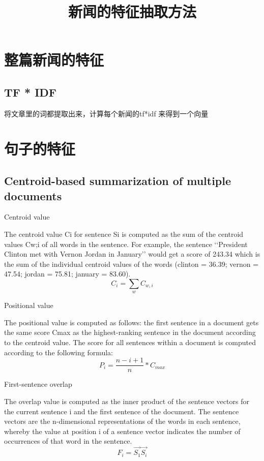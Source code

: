 \documentclass{article}
\begin{document}
\begin{CJK}{UTF8}{gkai}


\title{新闻的特征抽取方法}
\maketitle

\section{整篇新闻的特征}

\subsection{TF * IDF}

将文章里的词都提取出来，计算每个新闻的tf*idf 来得到一个向量


\section{句子的特征}
\subsection{Centroid-based summarization of multiple documents}
\cite{2004-Radev-p919-938}

Centroid value

The centroid value Ci for sentence Si is computed as the sum of the centroid values Cw;i of all words in the sentence. For example, the sentence ‘‘President Clinton met with Vernon Jordan in January’’ would get a score of 243.34 which is the sum of the individual centroid values of the words (clinton = 36.39; vernon = 47.54; jordan = 75.81; january = 83.60).
\begin{equation}
C_i = \sum_wC_{w,i}
\end{equation}

Positional value

The positional value is computed as follows: the first sentence in a document gets the same score Cmax as the highest-ranking sentence in the document according to the centroid value. The score for all sentences within a document is computed according to the following formula:
\begin{equation}
P_i = \frac{n-i+1}{n}*C_{max}
\end{equation}

First-sentence overlap

The overlap value is computed as the inner product of the sentence vectors for the current
sentence i and the first sentence of the document. The sentence vectors are the n-dimensional
representations of the words in each sentence, whereby the value at position i of a sentence vector
indicates the number of occurrences of that word in the sentence.
\begin{equation}
F_i = \overrightarrow{S_1}\overrightarrow{S_i}
\end{equation}

\end{CJK}



\end{document}
